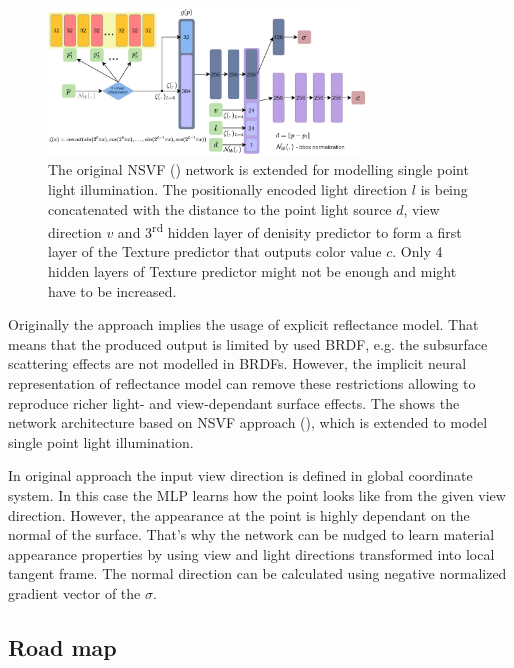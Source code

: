 \documentclass[english]{article}
\begin{document}
\begin{figure}[h]
    \centering
    \includegraphics[width=0.75\textwidth]{img/mlp_nsvfnrf_implicit.png}
    \caption{The original NSVF (\cite{nsvf2020}) network is extended for modelling single point light illumination. The positionally encoded light direction $l$ is being concatenated with the distance to the point light source $d$, view direction $v$ and 3\textsuperscript{rd} hidden layer of denisity predictor to form a first layer of the Texture predictor that outputs color value $c$. Only 4 hidden layers of Texture predictor might not be enough and might have to be increased.}
    \label{fig:mlp_nsvfnrf_implicit}
\end{figure}

Originally the approach implies the usage of explicit reflectance model.
That means that the produced output is limited by used BRDF, e.g. the subsurface scattering effects are not modelled in BRDFs.
However, the implicit neural representation of reflectance model can remove these restrictions allowing to reproduce richer light- and view-dependant surface effects. The  shows the network architecture based on NSVF approach (\cite{nsvf2020}), which is extended to model single point light illumination.

In original approach the input view direction is defined in global coordinate system.
In this case the MLP learns how the point looks like from the given view direction.
However, the appearance at the point is highly dependant on the normal of the surface.
That's why the network can be nudged to learn material appearance properties by using view and light directions transformed into local tangent frame.
The normal direction can be calculated using negative normalized gradient vector of the $\sigma$.


\subsection{Road map}
\label{roadmap}
\end{document}
